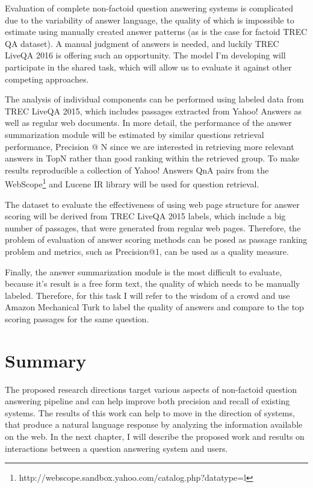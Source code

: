 Evaluation of complete non-factoid question answering systems is complicated due to the variability of answer language, the quality of which is impossible to estimate using manually created answer patterns (as is the case for factoid TREC QA dataset).
A manual judgment of answers is needed, and luckily TREC LiveQA 2016 is offering such an opportunity.
The model I'm developing will participate in the shared task, which will allow us to evaluate it against other competing approaches.

The analysis of individual components can be performed using labeled data from TREC LiveQA 2015, which includes passages extracted from Yahoo! Answers as well as regular web documents.
In more detail, the performance of the answer summarization module will be estimated by similar questions retrieval performance, \eg Precision @ N since we are interested in retrieving more relevant answers in TopN rather than good ranking within the retrieved group.
To make results reproducible a collection of Yahoo! Answers QnA pairs from the WebScope\footnote{http://webscope.sandbox.yahoo.com/catalog.php?datatype=l} and Lucene IR library will be used for question retrieval.

The dataset to evaluate the effectiveness of using web page structure for answer scoring will be derived from TREC LiveQA 2015 labels, which include a big number of passages, that were generated from regular web pages.
Therefore, the problem of evaluation of answer scoring methods can be posed as passage ranking problem and metrics, such as Precision@1, can be used as a quality measure.

Finally, the answer summarization module is the most difficult to evaluate, because it's result is a free form text, the quality of which needs to be manually labeled.
Therefore, for this task I will refer to the wisdom of a crowd and use Amazon Mechanical Turk to label the quality of answers and compare to the top scoring passages for the same question.

\section{Summary}
\label{sec:non-factoid:summary}

The proposed research directions target various aspects of non-factoid question answering pipeline and can help improve both precision and recall of existing systems.
The results of this work can help to move in the direction of systems, that produce a natural language response by analyzing the information available on the web.
In the next chapter, I will describe the proposed work and results on interactions between a question answering system and users.

